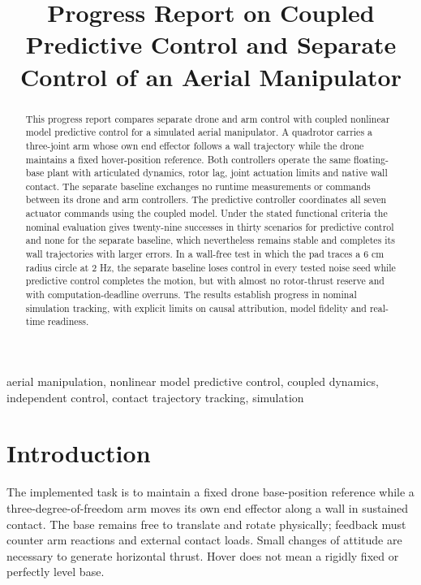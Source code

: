 \documentclass[conference]{IEEEtran}
\begin{document}
\title{Progress Report on Coupled Predictive Control and Separate Control of an Aerial Manipulator}
\author{
\and
{}
}
\maketitle
\begin{abstract}
This progress report compares separate drone and arm control with coupled nonlinear model predictive control for a simulated aerial manipulator. A quadrotor carries a three-joint arm whose own end effector follows a wall trajectory while the drone maintains a fixed hover-position reference. Both controllers operate the same floating-base plant with articulated dynamics, rotor lag, joint actuation limits and native wall contact. The separate baseline exchanges no runtime measurements or commands between its drone and arm controllers. The predictive controller coordinates all seven actuator commands using the coupled model. Under the stated functional criteria the nominal evaluation gives twenty-nine successes in thirty scenarios for predictive control and none for the separate baseline, which nevertheless remains stable and completes its wall trajectories with larger errors. In a wall-free test in which the pad traces a 6 cm radius circle at 2 Hz, the separate baseline loses control in every tested noise seed while predictive control completes the motion, but with almost no rotor-thrust reserve and with computation-deadline overruns. The results establish progress in nominal simulation tracking, with explicit limits on causal attribution, model fidelity and real-time readiness.
\end{abstract}
\begin{IEEEkeywords}
aerial manipulation, nonlinear model predictive control, coupled dynamics, independent control, contact trajectory tracking, simulation
\end{IEEEkeywords}

\section{Introduction}
The implemented task is to maintain a fixed drone base-position reference while a three-degree-of-freedom arm moves its own end effector along a wall in sustained contact. The base remains free to translate and rotate physically; feedback must counter arm reactions and external contact loads. Small changes of attitude are necessary to generate horizontal thrust. Hover does not mean a rigidly fixed or perfectly level base.
\end{document}
